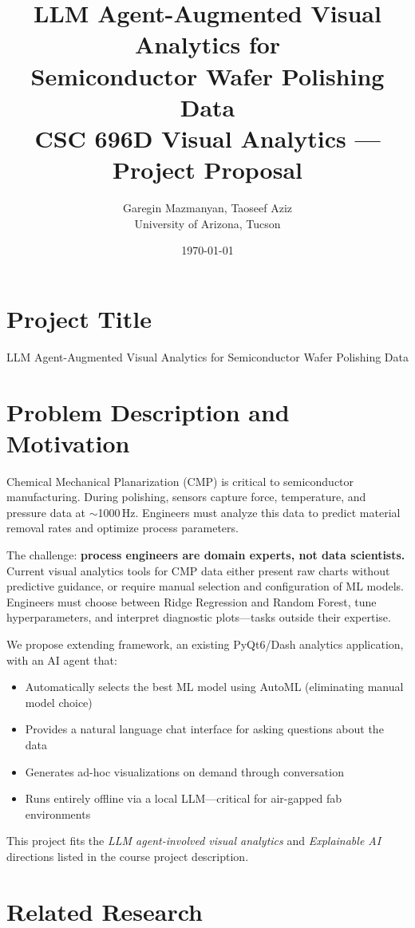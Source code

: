 \documentclass[11pt]{article}
\title{\textbf{LLM Agent-Augmented Visual Analytics for\\Semiconductor Wafer Polishing Data}\\[0.5em]
\large CSC 696D Visual Analytics --- Project Proposal}
\author{Garegin Mazmanyan, Taoseef Aziz\\
University of Arizona, Tucson}
\date{\today}
\begin{document}
\maketitle

\section{Project Title}

LLM Agent-Augmented Visual Analytics for Semiconductor Wafer Polishing Data

\section{Problem Description and Motivation}

Chemical Mechanical Planarization (CMP) is critical to semiconductor manufacturing. During polishing, sensors capture force, temperature, and pressure data at $\sim$1000\,Hz. Engineers must analyze this data to predict material removal rates and optimize process parameters.

The challenge: \textbf{process engineers are domain experts, not data scientists.} Current visual analytics tools for CMP data either present raw charts without predictive guidance, or require manual selection and configuration of ML models. Engineers must choose between Ridge Regression and Random Forest, tune hyperparameters, and interpret diagnostic plots---tasks outside their expertise.

We propose extending framework, an existing PyQt6/Dash analytics application, with an AI agent that:
\begin{itemize}[noitemsep]
  \item Automatically selects the best ML model using AutoML (eliminating manual model choice)
  \item Provides a natural language chat interface for asking questions about the data
  \item Generates ad-hoc visualizations on demand through conversation
  \item Runs entirely offline via a local LLM---critical for air-gapped fab environments
\end{itemize}

This project fits the \textit{LLM agent-involved visual analytics} and \textit{Explainable AI} directions listed in the course project description.

\section{Related Research}
\end{document}
